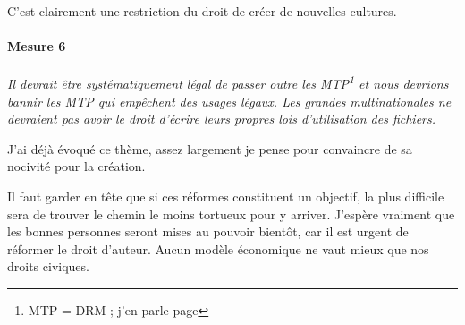 C'est clairement une restriction du droit de créer de nouvelles cultures.

\paragraph{Mesure 6}
\textit{Il devrait être systématiquement légal de passer outre les MTP\footnote{MTP = DRM ; j'en parle page \pageref{drm}} et nous devrions bannir les MTP qui empêchent des usages légaux.
Les grandes multinationales ne devraient pas avoir le droit d'écrire leurs propres lois d'utilisation des fichiers.}

J'ai déjà évoqué ce thème, assez largement je pense pour convaincre de sa nocivité pour la création.

\vspace{50pt}

Il faut garder en tête que si ces réformes constituent un objectif, la plus difficile sera de trouver le chemin le moins tortueux pour y arriver.
J'espère vraiment que les bonnes personnes seront mises au pouvoir bientôt, car il est urgent de réformer le droit d'auteur.
Aucun modèle économique ne vaut mieux que nos droits civiques.

